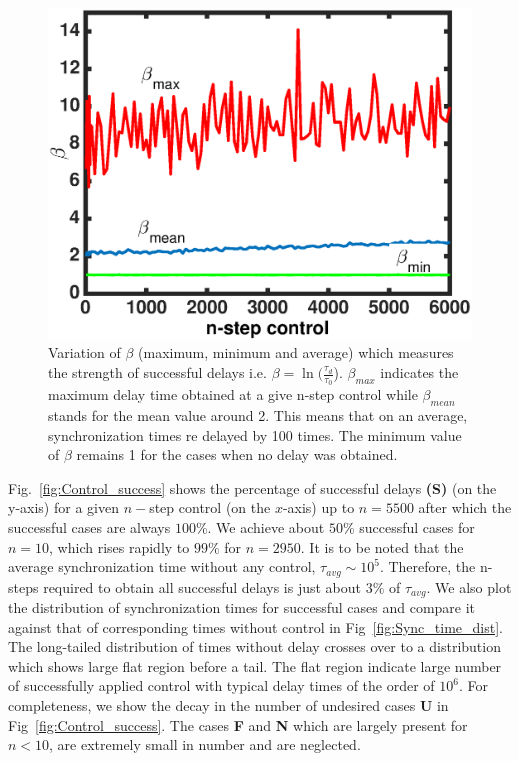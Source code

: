 \documentclass[reprint,amsmath,amssymb,aps,pre]{revtex4-1}
\begin{document}
\begin{figure}[b]
    \includegraphics[scale=0.42]{Strength_con.eps}
    \caption{\label{fig:Strength_con}\footnotesize Variation of $\beta$ 
        (maximum, minimum and average) which measures the strength of 
        successful 
        delays i.e. $\beta = \ln(\frac{\tau_d}{\tau_0}$). $\beta_{max}$ 
        indicates the maximum delay time obtained at a give n-step control 
        while $\beta_{mean}$ stands for the mean value around 2. This means 
        that on an average, synchronization times re delayed by 100 times. The 
        minimum value of $\beta$ remains 1 for the cases when no delay was 
        obtained. }
\end{figure}

Fig.~\ref{fig:Control_success} shows the percentage of successful delays 
\textbf{(S)} (on the y-axis) for a given $n-$step control (on the $x$-axis) up 
to $n = 5500$ after which the successful cases are always $100\%$.  We achieve 
about $50\%$ successful cases for $n = 10$, which rises rapidly to $99\%$ for 
$n = 2950$. It is to be noted that the average synchronization time without 
any control, $\tau_{avg} \sim 10^5$. Therefore, the n-steps required to obtain 
all successful delays is just about $3\%$ of $\tau_{avg}$. We also plot the 
distribution of synchronization times for successful cases and compare it 
against that of corresponding times without control in 
Fig~\ref{fig:Sync_time_dist}. The long-tailed 
distribution of times without delay crosses over to a distribution which shows 
large flat region before a tail. The flat region indicate large number of 
successfully applied control with typical delay times of the order of $10^6$. 
For completeness, we show the decay in the number of undesired cases 
\textbf{U} in Fig~\ref{fig:Control_success}.  The cases \textbf{F} and 
\textbf{N} which are largely present for $n<10$, are extremely small in number 
and are neglected.
\end{document}
